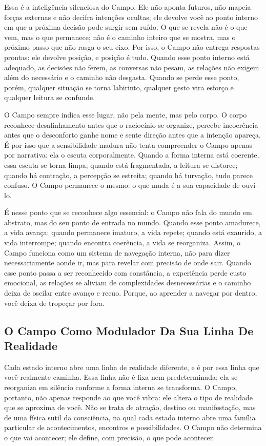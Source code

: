 \documentclass[12pt]{book}
\begin{document}
Essa é a inteligência silenciosa do Campo. Ele não aponta futuros, não mapeia forças externas e não decifra intenções ocultas; ele devolve você ao ponto interno em que a próxima decisão pode surgir sem ruído. O que se revela não é o que vem, mas o que permanece; não é o caminho inteiro que se mostra, mas o próximo passo que não rasga o seu eixo. Por isso, o Campo não entrega respostas prontas: ele devolve posição, e posição é tudo. Quando esse ponto interno está adequado, as decisões não ferem, as conversas não pesam, as relações não exigem além do necessário e o caminho não desgasta. Quando se perde esse ponto, porém, qualquer situação se torna labirinto, qualquer gesto vira esforço e qualquer leitura se confunde.

O Campo sempre indica esse lugar, não pela mente, mas pelo corpo. O corpo reconhece desalinhamento antes que o raciocínio se organize, percebe incoerência antes que o desconforto ganhe nome e sente direção antes que a intenção apareça. É por isso que a sensibilidade madura não tenta compreender o Campo apenas por narrativa: ela o escuta corporalmente. Quando a forma interna está coerente, essa escuta se torna limpa; quando está fragmentada, a leitura se distorce; quando há contração, a percepção se estreita; quando há turvação, tudo parece confuso. O Campo permanece o mesmo: o que muda é a sua capacidade de ouvi-lo.

É nesse ponto que se reconhece algo essencial: o Campo não fala do mundo em abstrato, mas do seu ponto de entrada no mundo. Quando esse ponto amadurece, a vida avança; quando permanece imaturo, a vida repete; quando está exaurido, a vida interrompe; quando encontra coerência, a vida se reorganiza. Assim, o Campo funciona como um sistema de navegação interna, não para dizer necessariamente aonde ir, mas para revelar com precisão de onde sair. Quando esse ponto passa a ser reconhecido com constância, a experiência perde custo emocional, as relações se aliviam de complexidades desnecessárias e o caminho deixa de oscilar entre avanço e recuo. Porque, ao aprender a navegar por dentro, você deixa de tropeçar por fora.

\subsection*{O Campo Como Modulador Da Sua Linha De Realidade}

Cada estado interno abre uma linha de realidade diferente, e é por essa linha que você realmente caminha. Essa linha não é fixa nem predeterminada; ela se reorganiza em silêncio conforme a forma interna se transforma. O Campo, portanto, não apenas responde ao que você vibra: ele altera o tipo de realidade que se aproxima de você. Não se trata de atração, destino ou manifestação, mas de uma física sutil da consciência, na qual cada estado interno abre uma família particular de acontecimentos, encontros e possibilidades. O Campo não determina o que vai acontecer; ele define, com precisão, o que pode acontecer.
\end{document}
